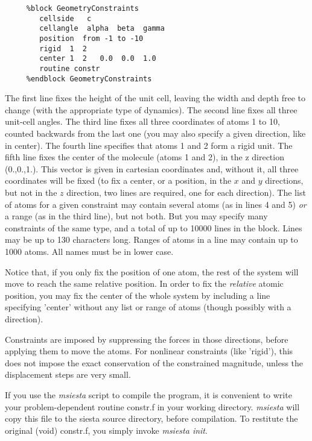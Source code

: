 \begin{description}
\begin{verbatim}
     %block GeometryConstraints
        cellside   c 
        cellangle  alpha  beta  gamma
        position  from -1 to -10
        rigid  1  2
        center 1  2   0.0  0.0  1.0
        routine constr
     %endblock GeometryConstraints
\end{verbatim}

The first line fixes the height of the unit cell, leaving the
width and depth free to change (with the appropriate type of dynamics). 
The second line fixes all three unit-cell angles. 
The third line fixes all three coordinates of
atoms 1 to 10, counted backwards from the last one
(you may also specify a given direction, like in center).
The fourth line specifies that atoms 1 and 2 form a rigid unit.
The fifth line fixes the center of the molecule (atoms 1 and 2),
in the z direction (0.,0.,1.). This vector is given in cartesian 
coordinates and, without it, all three coordinates will be
fixed (to fix a center, or a position, in the $x$ and $y$ directions,
but not in the $z$ direction, two lines are required, one for each
direction). 
The list of atoms for a given constraint may contain several atoms
(as in lines 4 and 5) {\it or} a range (as in the third line),
but not both. But you may specify many constraints of the same type,
and a total of up to 10000 lines in the block.
Lines may be up to 130 characters long. Ranges of atoms in a line
may contain up to 1000 atoms. All names must be in lower case.

Notice that, if you only fix the position of one atom, the rest of the
system will move to reach the same relative position. In order to
fix the {\it relative} atomic position, you may fix the center of
the whole system by including a line specifying 'center'
without any list or range of atoms (though possibly with a direction).

Constraints are imposed by suppressing the forces in those directions,
before applying them to move the atoms. For nonlinear constraints
(like 'rigid'), this does not impose the exact conservation of the 
constrained magnitude, unless the displacement steps are very small.

If you use the {\it msiesta} script to compile the program, it is
convenient to write your problem-dependent routine constr.f in your
working directory. {\it msiesta} will copy this file to the
siesta source directory, before compilation. To restitute the 
original (void) constr.f, you simply invoke {\it msiesta init}.


\end{description}
